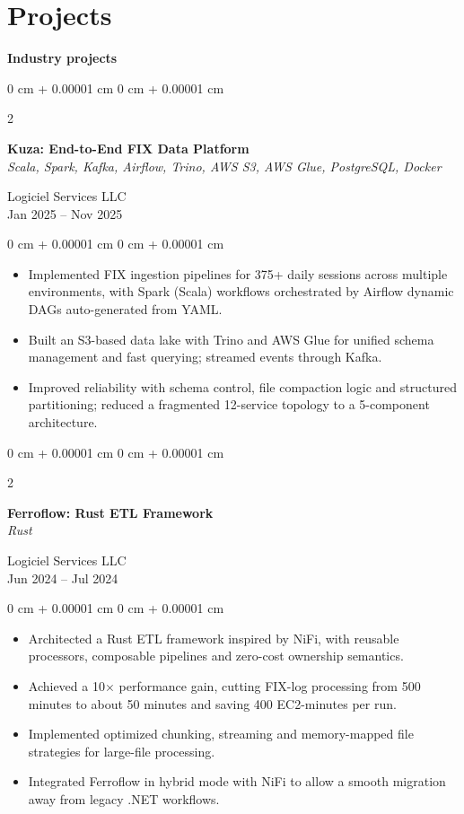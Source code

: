 \documentclass[10pt, letterpaper]{article}
\newenvironment{highlights}{
    \begin{itemize}[
        topsep=0.10 cm,
        parsep=0.10 cm,
        partopsep=0pt,
        itemsep=0pt,
        leftmargin=0 cm + 10pt
    ]
}{
    \end{itemize}
} %
\newenvironment{onecolentry}{
    \begin{adjustwidth}{
        0 cm + 0.00001 cm
    }{
        0 cm + 0.00001 cm
    }
}{
    \end{adjustwidth}
} %
\newenvironment{twocolentry}[2][]{
    \onecolentry
    \def\secondColumn{#2}
    \setcolumnwidth{\fill, 4.5 cm}
    \begin{paracol}{2}
}{
    \switchcolumn \raggedleft \secondColumn
    \end{paracol}
    \endonecolentry
} %
\begin{document}
\section{Projects}

\textbf{Industry projects}

\vspace{0.15 cm}

\begin{twocolentry}{Logiciel Services LLC \\ Jan 2025 -- Nov 2025}
    \textbf{Kuza: End-to-End FIX Data Platform} \\
    \textit{Scala, Spark, Kafka, Airflow, Trino, AWS S3, AWS Glue, PostgreSQL, Docker}
\end{twocolentry}
\begin{onecolentry}
    \begin{highlights}
        \item Implemented FIX ingestion pipelines for 375+ daily sessions across multiple environments, with Spark (Scala) workflows orchestrated by Airflow dynamic DAGs auto-generated from YAML.
        \item Built an S3-based data lake with Trino and AWS Glue for unified schema management and fast querying; streamed events through Kafka.
        \item Improved reliability with schema control, file compaction logic and structured partitioning; reduced a fragmented 12-service topology to a 5-component architecture.
    \end{highlights}
\end{onecolentry}

\vspace{0.2 cm}

\begin{twocolentry}{Logiciel Services LLC \\ Jun 2024 -- Jul 2024}
    \textbf{Ferroflow: Rust ETL Framework} \\
    \textit{Rust}
\end{twocolentry}
\begin{onecolentry}
    \begin{highlights}
        \item Architected a Rust ETL framework inspired by NiFi, with reusable processors, composable pipelines and zero-cost ownership semantics.
        \item Achieved a 10$\times$ performance gain, cutting FIX-log processing from 500 minutes to about 50 minutes and saving 400 EC2-minutes per run.
        \item Implemented optimized chunking, streaming and memory-mapped file strategies for large-file processing.
        \item Integrated Ferroflow in hybrid mode with NiFi to allow a smooth migration away from legacy .NET workflows.
    \end{highlights}
\end{onecolentry}
\end{document}
